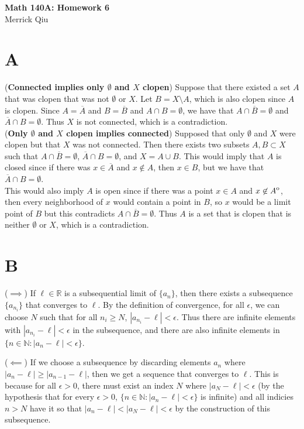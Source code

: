 \documentclass{article}
\newcommand{\interior}[1]{
  {\kern0pt#1}^{\mathrm{o}}
}
\begin{document}
\begin{center}
	\huge{\bf Math 140A: Homework 6} \\
	Merrick Qiu
\end{center}

\section*{A}
(\textbf{Connected implies only $\emptyset$ and $X$ clopen})
Suppose that there existed a set $A$ 
that was clopen that was not $\emptyset$ or $X$.
Let $B = X \setminus A$, which is also clopen since $A$ is clopen.
Since $A = \overline{A}$ and $B = \overline{B}$ and $A \cap B = \emptyset$,
we have that $A \cap \overline{B} = \emptyset$ and $\overline{A} \cap B = \emptyset$.
Thus $X$ is not connected, which is a contradiction. \\

(\textbf{Only $\emptyset$ and $X$ clopen implies connected})
Supposed that only $\emptyset$ and $X$ were clopen but that 
$X$ was not connected.
Then there exists two subsets $A, B \subset X$ such that
$A \cap \overline{B} = \emptyset$, $\overline{A} \cap B = \emptyset$,
and $X = A \cup B$. This would imply that $A$ is closed 
since if there was $x \in \overline{A}$ and $x \not\in A$,
then $x \in B$, but we have that $\overline{A} \cap B = \emptyset$. \\

This would also imply $A$ is open since 
if there was a point $x \in A$ and $x \not\in \interior{A}$,
then every neighborhood of $x$ would contain a point in $B$,
so $x$ would be a limit point of $B$ but this contradicts 
$A \cap \overline{B} = \emptyset$.
Thus $A$ is a set that is clopen that is neither $\emptyset$
or $X$, which is a contradiction.
\newpage 

\section*{B}
($\implies$) If $\ell \in \mathbb{R}$ is a subsequential limit of $\{a_n\}$,
then there exists a subsequence $\{a_{n_i}\}$ that converges to $\ell$.
By the definition of convergence, for all $\epsilon$,
we can choose $N$ such that for all $n_i \geq N$, $|a_{n_i} - \ell| < \epsilon$.
Thus there are infinite elements with $|a_{n_i} - \ell| < \epsilon$ 
in the subsequence, and there are also infinite elements in $\{n \in \mathbb{N} : |a_n - \ell| < \epsilon\}$.

($\impliedby$) If we choose a subsequence by
discarding elements $a_n$ where $|a_n - \ell| \geq |a_{n-1} - \ell|$,
then we get a sequence that converges to $\ell$.
This is because for all $\epsilon > 0$, there must exist an index $N$ where $|a_N - \ell| < \epsilon$
(by the hypothesis that for every $\epsilon > 0$, $\{n \in \mathbb{N} : |a_n - \ell| < \epsilon\}$ is infinite)
and all indicies $n > N$ have it so that $|a_n - \ell| < |a_N - \ell| < \epsilon$
by the construction of this subsequence.
\end{document}
